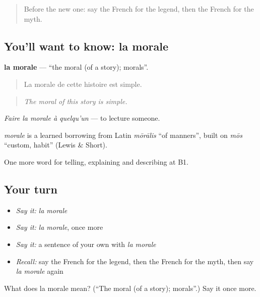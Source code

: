 \label{lesson:FR-C322-morale}



\begin{quote}
Before the new one: say the French for the legend, then the French for the myth.
\end{quote}

\subsection*{You'll want to know: la morale}
\textbf{la morale} — \textquotedblleft{}the moral (of a story); morals\textquotedblright{}.

\begin{quote}
La morale de cette histoire est simple.
\end{quote}

\begin{quote}
\emph{The moral of this story is simple.}
\end{quote}

\emph{Faire la morale à quelqu'un} — to lecture someone.

\begin{cousinweb}
\emph{morale} is a learned borrowing from Latin \emph{mōrālis} \textquotedblleft{}of manners\textquotedblright{}, built on \emph{mōs} \textquotedblleft{}custom, habit\textquotedblright{} (Lewis \& Short).
\end{cousinweb}

\begin{grammarlens}[title={What you've built}]
One more word for telling, explaining and describing at B1.
\end{grammarlens}

\subsection*{Your turn}
\begin{itemize}
\raggedright
  \item \emph{Say it:} \emph{la morale}
  \item \emph{Say it:} \emph{la morale}, once more
  \item \emph{Say it:} a sentence of your own with \emph{la morale}
  \item \emph{Recall:} say the French for the legend, then the French for the myth, then say \emph{la morale} again
\end{itemize}

\begin{tcolorbox}[breakable,colback=teal!4,colframe=teal!35!black,title={Before you move on}]
What does la morale mean? (\textquotedblleft{}The moral (of a story); morals\textquotedblright{}.) Say it once more.
\end{tcolorbox}
